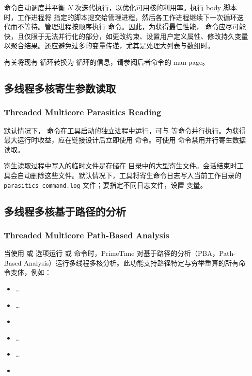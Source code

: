 
 命令自动调度并平衡 $N$ 次迭代执行，以优化可用核的利用率。执行 body 脚本时，工作进程将  指定的脚本提交给管理进程，然后各工作进程继续下一次循环迭代而不等待。管理进程按顺序执行  命令。因此，为获得最佳性能， 命令应尽可能快，且仅限于无法并行化的部分，如更改约束、设置用户定义属性、修改持久变量以聚合结果。还应避免过多的变量传递，尤其是处理大列表与数组时。

有关将现有  循环转换为  循环的信息，请参阅后者命令的 man page。

\subsection{多线程多核寄生参数读取}
\subsubsection*{Threaded Multicore Parasitics Reading}

默认情况下， 命令在工具启动的独立进程中运行，可与  等命令并行执行。为获得最大运行时收益，应在链接设计后立即使用  命令。可使用  命令禁用并行寄生数据读取。

寄生读取过程中写入的临时文件是存储在  目录中的大型寄生文件。会话结束时工具会自动删除这些文件。默认情况下，工具将寄生命令日志写入当前工作目录的 \texttt{parasitics\_command.log} 文件；要指定不同日志文件，设置  变量。

\subsection{多线程多核基于路径的分析}
\subsubsection*{Threaded Multicore Path-Based Analysis}

当使用  或  选项运行  或  命令时，PrimeTime 对基于路径的分析（PBA，Path-Based Analysis）运行多线程多核分析。此功能支持路径特定与穷举重算的所有命令变体，例如：
\begin{itemize}
  \item {} \ldots
  \item {} \ldots
  \item {}
  \item {} \ldots
  \item {} \ldots
  \item {}
\end{itemize}

